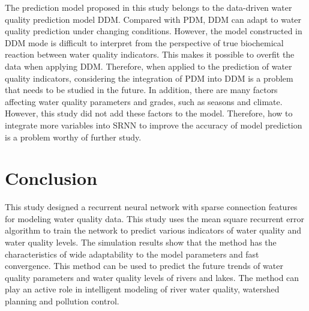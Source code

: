 \documentclass[runningheads]{llncs}
\begin{document}
The prediction model proposed in this study belongs to the 
data-driven water quality prediction model DDM. Compared with
PDM, DDM can adapt to water quality prediction under changing 
conditions. However, the model constructed in DDM mode is 
difficult to interpret from the perspective of true biochemical 
reaction between water quality indicators. This makes it possible
to overfit the data when applying DDM. Therefore, when applied to 
the prediction of water quality indicators, considering the integration 
of PDM into DDM is a problem that needs to be studied in the future.
In addition, there are many factors affecting water quality parameters 
and grades, such as seasons and climate. However, this study did not add 
these factors to the model. Therefore, how to integrate more variables 
into SRNN to improve the accuracy of model prediction is a problem 
worthy of further study.  

\section{Conclusion}
This study designed a recurrent neural network with sparse
connection features for modeling water quality data. 
This study uses the mean square recurrent error algorithm 
to train the network to predict various indicators of water 
quality and water quality levels. The simulation results 
show that the method has the characteristics of wide 
adaptability to the model parameters and fast convergence.
This method can be used to predict the future trends of
water quality parameters and water quality levels of 
rivers and lakes. The method can play an active role 
in intelligent modeling of river water quality, 
watershed planning and pollution control.
%
%
%
 
 
\end{document}
